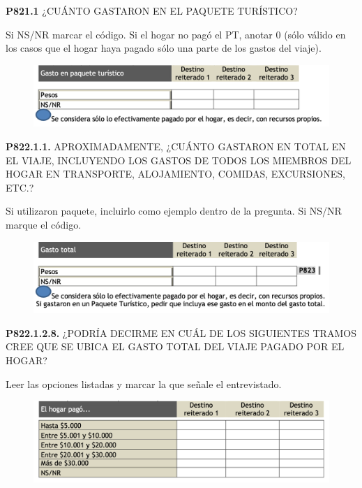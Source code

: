 \documentclass[
  openany]{book}
\begin{document}
\textbf{P821.1} ¿CUÁNTO GASTARON EN EL PAQUETE TURÍSTICO?

Si NS/NR marcar el código. Si el hogar no pagó el PT, anotar 0 (sólo válido en los casos que el hogar haya pagado sólo una parte de los gastos del viaje).

\begin{figure}

{\centering \includegraphics[width=1\linewidth]{imagenes/figura6-278} 

}

\end{figure}

\textbf{P822.1.1.} APROXIMADAMENTE, ¿CUÁNTO GASTARON EN TOTAL EN EL VIAJE, INCLUYENDO LOS GASTOS DE TODOS LOS MIEMBROS DEL HOGAR EN TRANSPORTE, ALOJAMIENTO, COMIDAS, EXCURSIONES, ETC.?

Si utilizaron paquete, incluirlo como ejemplo dentro de la pregunta. Si NS/NR marque el código.

\begin{figure}

{\centering \includegraphics[width=1\linewidth]{imagenes/figura6-279} 

}

\end{figure}

\textbf{P822.1.2.8.} ¿PODRÍA DECIRME EN CUÁL DE LOS SIGUIENTES TRAMOS CREE QUE SE UBICA EL GASTO TOTAL DEL VIAJE PAGADO POR EL HOGAR?

Leer las opciones listadas y marcar la que señale el entrevistado.

\begin{figure}

{\centering \includegraphics[width=1\linewidth]{imagenes/figura6-280} 

}

\end{figure}
\end{document}

